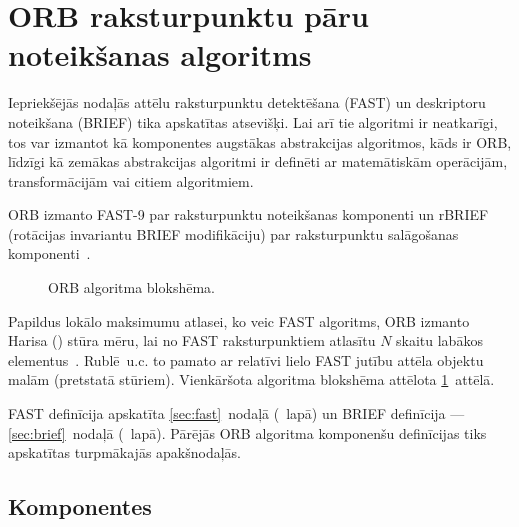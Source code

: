 \section{ORB raksturpunktu pāru noteikšanas algoritms}\label{sec:orb}
Iepriekšējās nodaļās attēlu raksturpunktu detektēšana (FAST) un
deskriptoru noteikšana (BRIEF) tika apskatītas atsevišķi. Lai arī tie
algoritmi ir neatkarīgi, tos
var izmantot kā komponentes augstākas abstrakcijas algoritmos, kāds ir ORB,
līdzīgi kā zemākas abstrakcijas algoritmi ir
definēti ar matemātiskām operācijām, transformācijām vai citiem algoritmiem.

ORB izmanto FAST-9 par raksturpunktu noteikšanas komponenti
 un rBRIEF 
(rotācijas invariantu BRIEF modifikāciju) par raksturpunktu salāgošanas
komponenti~\cite{ORB}.
\begin{figure}[tbh]
	\centering
	\def\svgwidth{\linewidth}
	{\small}
	\caption{ORB algoritma blokshēma.}
	\label{fig:orb-sheem}
\end{figure}
Papildus lokālo maksimumu atlasei, ko veic FAST algoritms, ORB izmanto
Harisa () stūra mēru, lai no FAST raksturpunktiem atlasītu
$N$ skaitu labākos elementus~\cite{ORB}.
Rublē~u.c.\cite{ORB} to pamato ar relatīvi lielo FAST jutību attēla
objektu malām (pretstatā stūriem). Vienkāršota algoritma blokshēma attēlota
\ref{fig:orb-sheem}~attēlā.

FAST definīcija apskatīta \ref{sec:fast}~nodaļā
(\pageref{sec:fast}~lapā) un BRIEF definīcija --- \ref{sec:brief}~nodaļā
(\pageref{sec:brief}~lapā). Pārējās ORB algoritma komponenšu definīcijas
tiks apskatītas turpmākajās apakšnodaļās.

\subsection{Komponentes}









